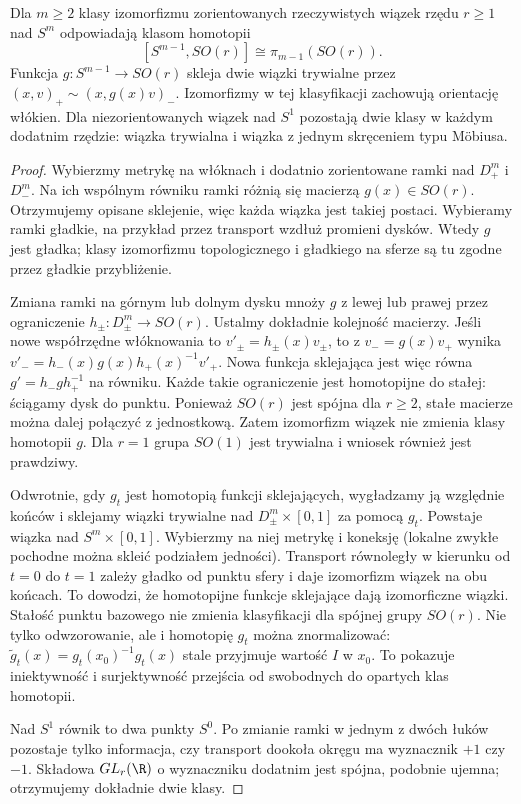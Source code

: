 \begin{twierdzenie}
\label{thm:clutching-16}
Dla $m\geq2$ klasy izomorfizmu zorientowanych
rzeczywistych wiązek
rzędu $r\geq1$ nad $S^m$
odpowiadają klasom homotopii
\[
 [S^{m-1},SO(r)]
 \cong\pi_{m-1}(SO(r)).
\]
Funkcja $g:S^{m-1}\to SO(r)$
skleja dwie wiązki
trywialne przez
$(x,v)_+\sim(x,g(x)v)_-$.
Izomorfizmy w tej klasyfikacji zachowują orientację włókien.
Dla niezorientowanych
wiązek nad $S^1$ pozostają
dwie klasy w każdym dodatnim
rzędzie: wiązka trywialna
i wiązka z jednym skręceniem
typu Möbiusa.
\end{twierdzenie}
\begin{proof}
Wybierzmy metrykę na włóknach
i dodatnio zorientowane ramki
nad $D^m_+$ i $D^m_-$.
Na ich wspólnym równiku
ramki różnią się macierzą
$g(x)\in SO(r)$. Otrzymujemy
opisane sklejenie, więc
każda wiązka jest takiej
postaci. Wybieramy ramki gładkie, na przykład przez transport
wzdłuż promieni dysków. Wtedy $g$ jest gładka;
klasy izomorfizmu
topologicznego i gładkiego
na sferze są tu zgodne
przez gładkie przybliżenie.

Zmiana ramki na górnym
lub dolnym dysku mnoży
$g$ z lewej lub prawej
przez ograniczenie
$h_\pm:D^m_\pm\to SO(r)$.
Ustalmy dokładnie kolejność macierzy.
Jeśli nowe współrzędne włóknowania to
$v'_\pm=h_\pm(x)v_\pm$, to z $v_-=g(x)v_+$
wynika $v'_-=h_-(x)g(x)h_+(x)^{-1}v'_+$.
Nowa funkcja sklejająca jest więc równa
$g'=h_-g h_+^{-1}$ na równiku.
Każde takie ograniczenie
jest homotopijne do stałej:
ściągamy dysk do punktu.
Ponieważ $SO(r)$ jest
spójna dla $r\geq2$,
stałe macierze można
dalej połączyć z
jednostkową. Zatem
izomorfizm wiązek
nie zmienia klasy
homotopii $g$.
Dla $r=1$ grupa $SO(1)$
jest trywialna i wniosek
również jest prawdziwy.

Odwrotnie, gdy $g_t$ jest homotopią funkcji
sklejających, wygładzamy ją względnie końców i sklejamy
wiązki trywialne nad
$D^m_\pm\times[0,1]$
za pomocą $g_t$.
Powstaje wiązka nad
$S^m\times[0,1]$.
Wybierzmy na niej
metrykę i koneksję
(lokalne zwykłe pochodne
można skleić podziałem
jedności). Transport
równoległy w kierunku
od $t=0$ do $t=1$
zależy gładko od punktu
sfery i daje izomorfizm
wiązek na obu końcach.
To dowodzi, że homotopijne
funkcje sklejające
dają izomorficzne wiązki.
Stałość punktu bazowego
nie zmienia klasyfikacji dla spójnej grupy $SO(r)$.
Nie tylko odwzorowanie, ale i homotopię $g_t$ można
znormalizować: $\widetilde g_t(x)=g_t(x_0)^{-1}g_t(x)$
stale przyjmuje wartość $I$ w $x_0$. To pokazuje
iniektywność i surjektywność przejścia od swobodnych
do opartych klas homotopii.

Nad $S^1$ równik to
dwa punkty $S^0$.
Po zmianie ramki w
jednym z dwóch łuków
pozostaje tylko informacja,
czy transport dookoła
okręgu ma wyznacznik
$+1$ czy $-1$.
Składowa $GL_r(\R)$
o wyznaczniku dodatnim
jest spójna, podobnie
ujemna; otrzymujemy
dokładnie dwie klasy.
\end{proof}

